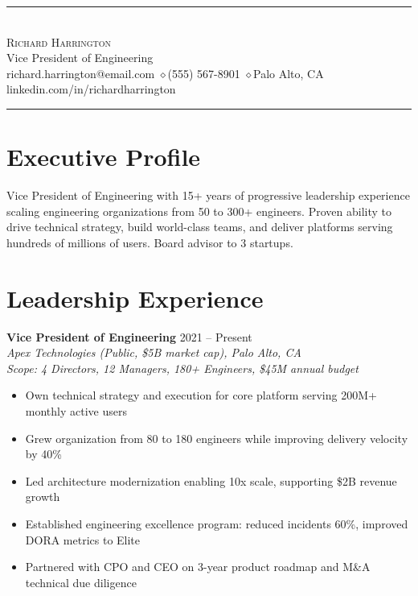 \documentclass[11pt,a4paper]{article}
\begin{document}
\begin{center}
\textcolor{accent}{\rule{3cm}{0.5pt}}\\[0.8em]
{\Huge\textsc{Richard Harrington}}\\[0.5em]
{\Large Vice President of Engineering}\\[0.5em]
{\small richard.harrington@email.com \quad$\diamond$\quad (555) 567-8901 \quad$\diamond$\quad Palo Alto, CA}\\[0.2em]
{\small linkedin.com/in/richardharrington}\\[0.3em]
\textcolor{accent}{\rule{3cm}{0.5pt}}
\end{center}

\vspace{0.5em}

\section{Executive Profile}
Vice President of Engineering with 15+ years of progressive leadership experience scaling engineering organizations from 50 to 300+ engineers. Proven ability to drive technical strategy, build world-class teams, and deliver platforms serving hundreds of millions of users. Board advisor to 3 startups.

\section{Leadership Experience}

\noindent\textbf{Vice President of Engineering} \hfill 2021 -- Present\\
\textit{Apex Technologies (Public, \$5B market cap), Palo Alto, CA}\\
\textit{Scope: 4 Directors, 12 Managers, 180+ Engineers, \$45M annual budget}
\begin{itemize}[leftmargin=1.5em,nosep,label={\color{accent}---}]
\item Own technical strategy and execution for core platform serving 200M+ monthly active users
\item Grew organization from 80 to 180 engineers while improving delivery velocity by 40\%
\item Led architecture modernization enabling 10x scale, supporting \$2B revenue growth
\item Established engineering excellence program: reduced incidents 60\%, improved DORA metrics to Elite
\item Partnered with CPO and CEO on 3-year product roadmap and M\&A technical due diligence
\end{itemize}
\vspace{0.6em}
\end{document}
